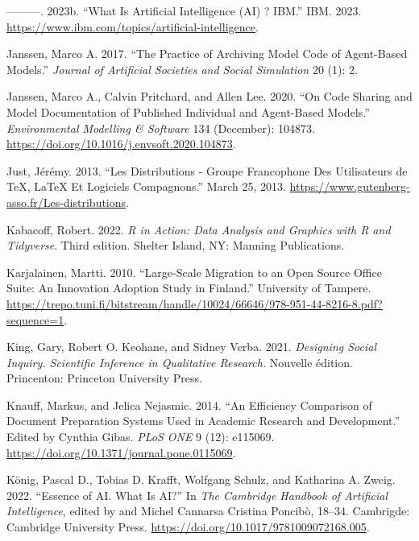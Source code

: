 \documentclass[
  letterpaper,
]{scrbook}
\newlength{\cslhangindent}
\newlength{\cslentryspacingunit} %
\newenvironment{CSLReferences}[2] %
 {%
  \setlength{\parindent}{0pt}
  \ifodd #1
  \let\oldpar\par
  \def\par{\hangindent=\cslhangindent\oldpar}
  \fi
  \setlength{\parskip}{#2\cslentryspacingunit}
 }%
 {}
\begin{document}
\begin{CSLReferences}{1}{0}
\leavevmode{}%
---------. 2023b. {``What Is {Artificial Intelligence} ({AI}) ?
\textbar{} {IBM}.''} IBM. 2023.
\url{https://www.ibm.com/topics/artificial-intelligence}.

\leavevmode{}%
Janssen, Marco A. 2017. {``The {Practice} of {Archiving Model Code} of
{Agent-Based Models}.''} \emph{Journal of Artificial Societies and
Social Simulation} 20 (1): 2.

\leavevmode{}%
Janssen, Marco A., Calvin Pritchard, and Allen Lee. 2020. {``On Code
Sharing and Model Documentation of Published Individual and Agent-Based
Models.''} \emph{Environmental Modelling \& Software} 134 (December):
104873. \url{https://doi.org/10.1016/j.envsoft.2020.104873}.

\leavevmode{}%
Just, Jérémy. 2013. {``Les Distributions - {Groupe} Francophone Des
{Utilisateurs} de {TeX}, {LaTeX} Et Logiciels Compagnons.''} March 25,
2013. \url{https://www.gutenberg-asso.fr/Les-distributions}.

\leavevmode{}%
Kabacoff, Robert. 2022. \emph{R in Action: Data Analysis and Graphics
with {R} and {Tidyverse}}. Third edition. Shelter Island, NY: Manning
Publications.

\leavevmode{}%
Karjalainen, Martti. 2010. {``Large-Scale Migration to an Open Source
Office Suite: {An} Innovation Adoption Study in {Finland}.''} University
of Tampere.
\url{https://trepo.tuni.fi/bitstream/handle/10024/66646/978-951-44-8216-8.pdf?sequence=1}.

\leavevmode{}%
King, Gary, Robert O. Keohane, and Sidney Verba. 2021. \emph{Designing
{Social Inquiry}. {Scientific Inference} in {Qualitative Research}.}
Nouvelle édition. Princenton: Princeton University Press.

\leavevmode{}%
Knauff, Markus, and Jelica Nejasmic. 2014. {``An {Efficiency Comparison}
of {Document Preparation Systems Used} in {Academic Research} and
{Development}.''} Edited by Cynthia Gibas. \emph{PLoS ONE} 9 (12):
e115069. \url{https://doi.org/10.1371/journal.pone.0115069}.

\leavevmode{}%
König, Pascal D., Tobias D. Krafft, Wolfgang Schulz, and Katharina A.
Zweig. 2022. {``Essence of {AI}. {What Is AI}?''} In \emph{The
{Cambridge Handbook} of {Artificial Intelligence}}, edited by and Michel
Cannarsa Cristina Poncibò, 18--34. Cambrigde: Cambridge University
Press. \url{https://doi.org/10.1017/9781009072168.005}.


\end{CSLReferences}
\end{document}
